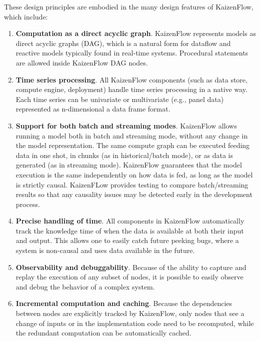 \documentclass[11pt, reqno]{amsart}
\theoremstyle{definition}
\theoremstyle{remark}
\begin{document}
  These design principles are embodied in the many design features of KaizenFlow,
  which include:
  \begin{enumerate}
    \item \textbf{Computation as a direct acyclic graph}. KaizenFlow represents models
      as direct acyclic graphs (DAG), which is a natural form for dataflow and
      reactive models typically found in real-time systems. Procedural statements
      are allowed inside KaizenFlow DAG nodes.

    \item \textbf{Time series processing}. All KaizenFlow components (such as
      data store, compute engine, deployment) handle time series processing in a
      native way. Each time series can be univariate or multivariate (e.g., panel
      data) represented as n-dimensional a data frame format.

    \item \textbf{Support for both batch and streaming modes}. KaizenFlow allows
      running a model both in batch and streaming mode, without any change in
      the model representation. The same compute graph can be executed feeding data
      in one shot, in chunks (as in historical/batch mode), or as data is generated
      (as in streaming mode). KaizenFlow guarantees that the model execution is
      the same independently on how data is fed, as long as the model is strictly
      causal. KaizenFLow provides testing to compare batch/streaming results so
      that any causality issues may be detected early in the development process.

    \item \textbf{Precise handling of time}. All components in KaizenFlow automatically
      track the knowledge time of when the data is available at both their input
      and output. This allows one to easily catch future peeking bugs, where a system
      is non-causal and uses data available in the future.

    \item \textbf{Observability and debuggability}. Because of the ability to capture
      and replay the execution of any subset of nodes, it is possible to easily
      observe and debug the behavior of a complex system.

    \item \textbf{Incremental computation and caching}. Because the dependencies
      between nodes are explicitly tracked by KaizenFlow, only nodes that see a
      change of inputs or in the implementation code need to be recomputed, while
      the redundant computation can be automatically cached.


\end{enumerate}
\end{document}
